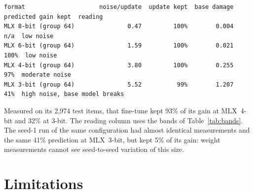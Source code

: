 \documentclass[11pt,letterpaper]{article}
\begin{document}
\begin{scriptsize}
\begin{verbatim}
format                     noise/update  update kept  base damage  predicted gain kept  reading
MLX 8-bit (group 64)               0.47         100%        0.004                  n/a  low noise
MLX 6-bit (group 64)               1.59         100%        0.021                 100%  low noise
MLX 4-bit (group 64)               3.80         100%        0.255                  97%  moderate noise
MLX 3-bit (group 64)               5.52          99%        1.207                  41%  high noise, base model breaks
\end{verbatim}
\end{scriptsize}

\noindent Measured on its 2,974 test items, that fine-tune kept 93\% of its gain at MLX~4-bit and 32\% at 3-bit. The reading column uses the bands of Table~\ref{tab:bands}. The seed-1 run of the same configuration had almost identical measurements and the same 41\% prediction at MLX~3-bit, but kept 5\% of its gain: weight measurements cannot see seed-to-seed variation of this size.

\section{Limitations}
\label{sec:limits}
\end{document}
